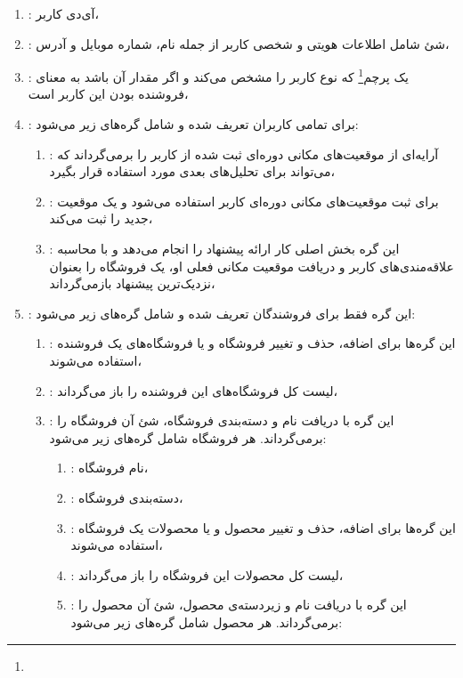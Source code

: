 \begin{enumerate}
	\item {}: آی‌دی کاربر،
	\item {}: شئ شامل اطلاعات هویتی و شخصی کاربر از جمله نام، شماره موبایل و آدرس،
	\item {}: یک پرچم\footnote{} که نوع کاربر را مشخص می‌کند و اگر مقدار آن  باشد به معنای فروشنده بودن این کاربر است،
	\item {}: برای تمامی کاربران تعریف شده و شامل گره‌های زیر می‌شود:
	\begin{enumerate}
		\item {}: آرایه‌ای از موقعیت‌های مکانی دوره‌ای ثبت شده از کاربر را برمی‌گرداند که می‌تواند برای تحلیل‌های بعدی مورد استفاده قرار بگیرد،
		\item {}: برای ثبت موقعیت‌های مکانی دوره‌ای کاربر استفاده می‌شود و یک موقعیت جدید را ثبت می‌کند،
		\item {}: این گره بخش اصلی کار ارائه پیشنهاد را انجام می‌دهد و با محاسبه علاقه‌مندی‌های کاربر و دریافت موقعیت مکانی فعلی او، یک فروشگاه را بعنوان نزدیک‌ترین پیشنهاد بازمی‌گرداند،
	\end{enumerate}
	\item {}: این گره فقط برای فروشندگان تعریف شده و شامل گره‌های زیر می‌شود:
	\begin{enumerate}
		\item {}: این گره‌ها برای اضافه، حذف و تغییر فروشگاه و یا فروشگاه‌های یک فروشنده استفاده می‌شوند،
		\item {}: لیست کل فروشگاه‌های این فروشنده را باز می‌گرداند،
		\item {}: این گره با دریافت نام و دسته‌بندی فروشگاه، شئ آن فروشگاه را برمی‌گرداند. هر فروشگاه شامل گره‌های زیر می‌شود:
		\begin{enumerate}[label=\arabic*.]
			\item {}: نام فروشگاه،
			\item {}: دسته‌بندی فروشگاه،
			\item {}: این گره‌ها برای اضافه، حذف و تغییر محصول و یا محصولات یک فروشگاه استفاده می‌شوند،
			\item {}: لیست کل محصولات این فروشگاه را باز می‌گرداند،
			\item {}: این گره با دریافت نام و زیردسته‌ی محصول، شئ آن محصول را برمی‌گرداند. هر محصول شامل گره‌های زیر می‌شود:

\end{enumerate}
\end{enumerate}
\end{enumerate}
